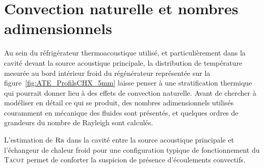 \section{Convection naturelle et nombres adimensionnels}\label{chap:NbrAdim}
Au sein du réfrigérateur thermoacoustique utilisé, et particulièrement dans la cavité devant la source acoustique principale, la distribution de température mesurée au bord intérieur froid du régénérateur représentée sur la figure~\ref{fig:ATE_ProfilsCHX_5mm} laisse penser à une stratification thermique qui pourrait donner lieu à des effets de convection naturelle. Avant de chercher à modéliser en détail ce qui se produit, des nombres adimensionnels utilisés couramment en mécanique des fluides sont présentés, et quelques ordres de grandeurs du nombre de Rayleigh sont calculés.

L'estimation de $\mathrm{Ra}$ dans la cavité entre la source acoustique principale et l'échangeur de chaleur froid pour une configuration typique de fonctionnement du \textsc{Tacot} permet de conforter la suspicion de présence d'écoulements convectifs.




